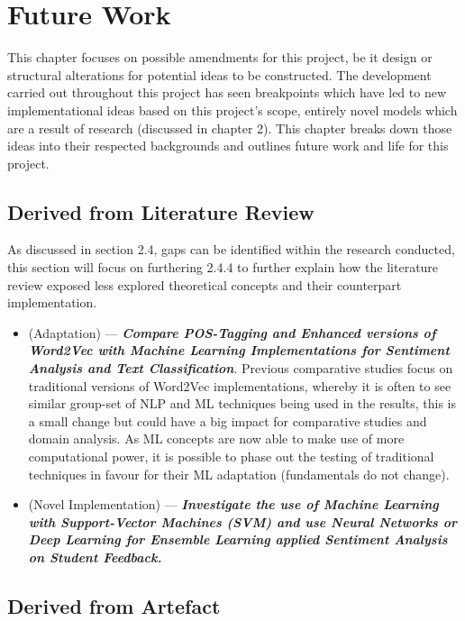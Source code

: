 \chapter{Future Work}

This chapter focuses on possible amendments for this project, be it design or structural alterations for potential ideas to be constructed. The development carried out throughout this project has seen breakpoints which have led to new implementational ideas based on this project’s scope, entirely novel models which are a result of research (discussed in chapter 2). This chapter breaks down those ideas into their respected backgrounds and outlines future work and life for this project.

\section{Derived from Literature Review}

As discussed in section 2.4, gaps can be identified within the research conducted, this section will focus on furthering 2.4.4 to further explain how the literature review exposed less explored theoretical concepts and their counterpart implementation.

\begin{itemize}
    \item (Adaptation) --- \textbf{\textit{Compare POS-Tagging and Enhanced versions of Word2Vec with Machine Learning Implementations for Sentiment Analysis and Text Classification}}. Previous comparative studies focus on traditional versions of Word2Vec implementations, whereby it is often to see similar group-set of NLP and ML techniques being used in the results, this is a small change but could have a big impact for comparative studies and domain analysis. As ML concepts are now able to make use of more computational power, it is possible to phase out the testing of traditional techniques in favour for their ML adaptation (fundamentals do not change).
    \item (Novel Implementation) --- \textbf{\textit{Investigate the use of Machine Learning with Support-Vector Machines (SVM) and use Neural Networks or Deep Learning for Ensemble Learning applied Sentiment Analysis on Student Feedback.}}
\end{itemize}

\section{Derived from Artefact}

